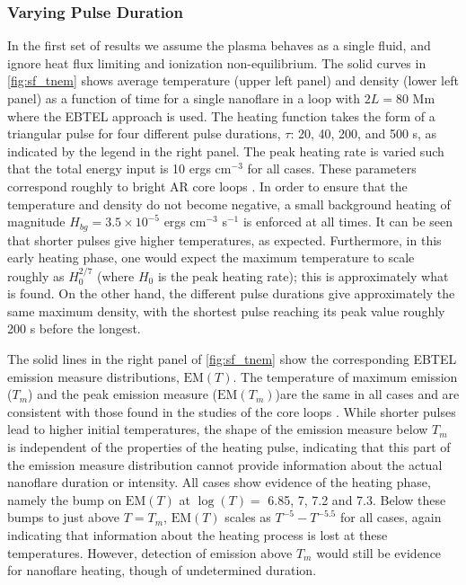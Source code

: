 \documentclass[apj]{emulateapj}
\begin{document}
	\subsubsection{Varying Pulse Duration}
	\label{subsubsec:pulse_res}
		\par In the first set of results we assume the plasma behaves as a single fluid, and ignore heat flux limiting and ionization non-equilibrium. The solid curves in \autoref{fig:sf_tnem} shows average temperature (upper left panel) and density (lower left panel) as a function of time for a single nanoflare in a loop with $2L = 80$ Mm where the EBTEL approach is used.  The heating function takes the form of a triangular pulse for four different pulse durations, $\tau$: 20, 40, 200, and 500 s, as indicated by the legend in the right panel. The peak heating rate is varied such that the total energy input is 10 ergs cm$^{-3}$ for all cases. These parameters correspond roughly to bright AR core loops \citep{warren_systematic_2012}. In order to ensure that the temperature and density do not become negative, a small background heating of magnitude $H_{bg}=3.5\times10^{-5}$ ergs cm$^{-3}$ s$^{-1}$ is enforced at all times. It can be seen that shorter pulses give higher temperatures, as expected. Furthermore, in this early heating phase, one would expect the maximum temperature to scale roughly as $H_0^{2/7}$ (where $H_0$ is the peak heating rate); this is approximately what is found. On the other hand, the different pulse durations give approximately the same maximum density, with the shortest pulse reaching its peak value roughly 200 s before the longest. 
		\par The solid lines in the right panel of \autoref{fig:sf_tnem} show the corresponding EBTEL emission measure distributions, $\mathrm{EM}(T)$. The temperature of maximum emission ($T_m$) and the peak emission measure ($\mathrm{EM}(T_m)$)are the same in all cases and are consistent with those found in the studies of the core loops \citep{warren_systematic_2012}. While shorter pulses lead to higher initial temperatures, the shape of the emission measure below $T_m$ is independent of the properties of the heating pulse, indicating that this part of the emission measure distribution cannot provide information about the actual nanoflare duration or intensity. All cases show evidence of the heating phase, namely the bump on $\mathrm{EM}(T)$ at $\log{(T)} =$ 6.85, 7, 7.2 and 7.3. Below these bumps to just above $T = T_m$, $\mathrm{EM}(T)$ scales as $T^{-5}-T^{-5.5}$ for all cases, again indicating that information about the heating process is lost at these temperatures. However, detection of emission above $T_m$ would still be evidence for nanoflare heating, though of undetermined duration.  
\end{document}
